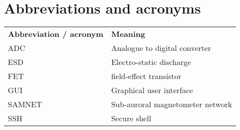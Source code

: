 \chapter{Abbreviations and acronyms}
\begin{table}[!h]
  \begin{center}
    \begin{tabular}{ll}
      \textbf{Abbreviation / acronym} & \textbf{Meaning} \\
      ADC & Analogue to digital converter \\
      ESD & Electro-static discharge\\
      FET & field-effect transistor\\
      GUI & Graphical user interface\\
      SAMNET & Sub-auroral magnetometer network\\
      SSH & Secure shell\\
    \end{tabular}
    \label{tab:-abbreviations}
  \end{center}
\end{table}

